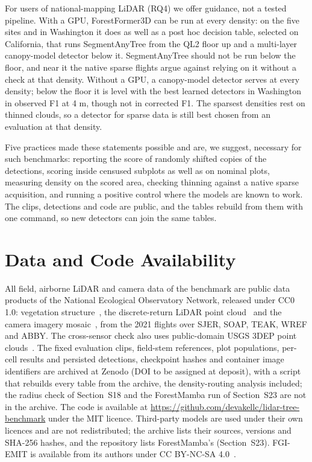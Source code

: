 \documentclass[journal]{IEEEtran}
\begin{document}
For users of national-mapping LiDAR (RQ4) we offer guidance, not a tested
pipeline. With a GPU, ForestFormer3D can be run at every density: on the five
sites and in Washington it does as well as a post hoc decision table, selected
on California, that runs SegmentAnyTree from the QL2 floor up and a multi-layer
canopy-model detector below it. SegmentAnyTree should not be run below the
floor, and near it the native sparse flights argue against relying on it without
a check at that density. Without a GPU, a canopy-model detector serves at every
density; below the floor it is level with the best learned detectors in
Washington in observed F1 at 4 m, though not in corrected F1. The sparsest
densities rest on thinned clouds, so a detector for sparse data is still best
chosen from an evaluation at that density.

Five practices made these statements possible and are, we suggest, necessary for
such benchmarks: reporting the score of randomly shifted copies of the
detections, scoring inside censused subplots as well as on nominal plots,
measuring density on the scored area, checking thinning against a native sparse
acquisition, and running a positive control where the models are known to work.
The clips, detections and code are public, and the tables rebuild from them with
one command, so new detectors can join the same tables.


\section*{Data and Code Availability}

All field, airborne LiDAR and camera data of the benchmark are public data
products of the National Ecological Observatory Network, released under CC0 1.0:
vegetation structure~\cite{neon2026vegetation}, the discrete-return LiDAR point
cloud~\cite{neon2026discrete} and the camera imagery mosaic~\cite{neon2026camera}, from
the 2021 flights over SJER, SOAP, TEAK, WREF and ABBY. The cross-sensor check
also uses public-domain USGS 3DEP point clouds~\cite{usgs2026usgs}. The fixed
evaluation clips, field-stem references, plot populations, per-cell results and
persisted detections, checkpoint hashes and container image identifiers are
archived at Zenodo (DOI to be assigned at deposit), with a script that rebuilds
every table from the archive, the density-routing analysis included; the radius
check of Section~S18 and the ForestMamba run of Section~S23 are not in the
archive. The code is available at
\url{https://github.com/devakellc/lidar-tree-benchmark} under the MIT licence.
Third-party models are used under their own licences and are not redistributed;
the archive lists their sources, versions and SHA-256 hashes, and the repository
lists ForestMamba's (Section~S23). FGI-EMIT is available from its authors under
CC BY-NC-SA 4.0~\cite{ruoppa2026fgiemit}.
\end{document}
